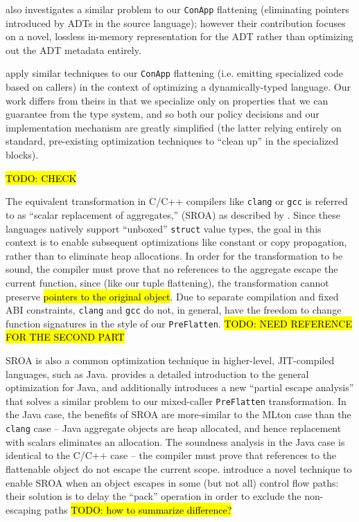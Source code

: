 \citet{double-steal-paper} also investigates a similar problem to our
\texttt{ConApp} flattening (eliminating pointers introduced by ADTs in the
source language); however their contribution focuses on a novel, lossless
in-memory representation for the ADT rather than optimizing out the ADT metadata
entirely.

\citet{bbv-paper} apply similar techniques to our \texttt{ConApp} flattening
(i.e. emitting specialized code based on callers) in the context of optimizing a
dynamically-typed language. Our work differs from theirs in that we specialize
only on properties that we can guarantee from the type system, and so both our
policy decisions and our implementation mechanism are greatly simplified (the
latter relying entirely on standard, pre-existing optimization techniques to
``clean up'' in the specialized blocks).

\hl{TODO: CHECK}

The equivalent transformation in C/C++ compilers like \texttt{clang} or
\texttt{gcc} is referred to as ``scalar replacement of aggregates,'' (SROA) as
described by \citet{munchick-compiler-design}. Since these languages natively
support ``unboxed'' \texttt{struct} value types, the goal in this context is to
enable subsequent optimizations like constant or copy propagation, rather than
to eliminate heap allocations. In order for the transformation to be sound, the
compiler must prove that no references to the aggregate escape the current
function, since (like our tuple flattening), the transformation cannot preserve
\hl{pointers to the original object}. Due to separate compilation and fixed ABI
constraints, \texttt{clang} and \texttt{gcc} do not, in general, have the
freedom to change function signatures in the style of our \texttt{PreFlatten}.
\hl{TODO: NEED REFERENCE FOR THE SECOND PART}

SROA is also a common optimization technique in higher-level, JIT-compiled
languages, such as Java. \citet{partial-escape-thesis} provides a detailed
introduction to the general optimization for Java, and additionally introduces a
new ``partial escape analysis'' that solves a similar problem to our
mixed-caller \texttt{PreFlatten} transformation. In the Java case, the benefits
of SROA are more-similar to the MLton case than the \texttt{clang} case -- Java
aggregate objects are heap allocated, and hence replacement with scalars
eliminates an allocation. The soundness analysis in the Java case is identical
to the C/C++ case -- the compiler must prove that references to the flattenable
object do not escape the current scope. \citet{partial-escape-analysis}
introduce a novel technique to enable SROA when an object escapes in some (but
not all) control flow paths: their solution is to delay the ``pack'' operation
in order to exclude the non-escaping paths \hl{TODO: how to summarize difference?}


